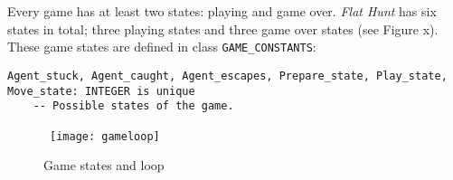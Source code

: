 Every game has at least two states: playing and game over. \emph{Flat Hunt} has six states in total; three playing states and three game over states (see Figure x). These game states are defined in class \texttt{GAME\_CONSTANTS}:

\begin{lstlisting}
Agent_stuck, Agent_caught, Agent_escapes, Prepare_state, Play_state, 
Move_state: INTEGER is unique
	-- Possible states of the game.
\end{lstlisting}

\begin{figure}[h]
  \centerline{\hbox{
    \texttt{[image: gameloop]}
  }}
\caption{Game states and loop}
\label{gameloop}
\end{figure}
